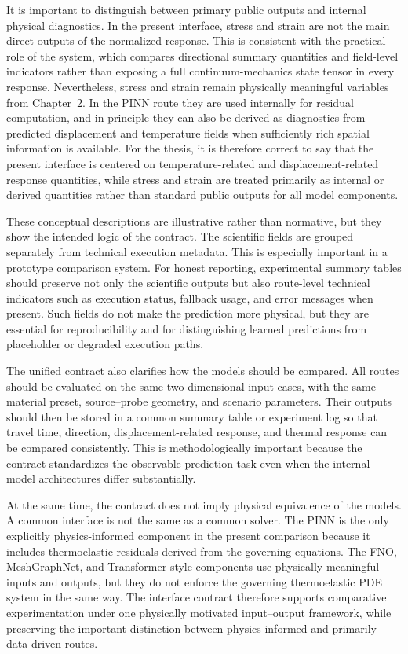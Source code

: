 It is important to distinguish between primary public outputs and internal physical diagnostics. In the present interface, stress and strain are not the main direct outputs of the normalized response. This is consistent with the practical role of the system, which compares directional summary quantities and field-level indicators rather than exposing a full continuum-mechanics state tensor in every response. Nevertheless, stress and strain remain physically meaningful variables from Chapter~2. In the PINN route they are used internally for residual computation, and in principle they can also be derived as diagnostics from predicted displacement and temperature fields when sufficiently rich spatial information is available. For the thesis, it is therefore correct to say that the present interface is centered on temperature-related and displacement-related response quantities, while stress and strain are treated primarily as internal or derived quantities rather than standard public outputs for all model components.

These conceptual descriptions are illustrative rather than normative, but they show the intended logic of the contract. The scientific fields are grouped separately from technical execution metadata. This is especially important in a prototype comparison system. For honest reporting, experimental summary tables should preserve not only the scientific outputs but also route-level technical indicators such as execution status, fallback usage, and error messages when present. Such fields do not make the prediction more physical, but they are essential for reproducibility and for distinguishing learned predictions from placeholder or degraded execution paths.

The unified contract also clarifies how the models should be compared. All routes should be evaluated on the same two-dimensional input cases, with the same material preset, source--probe geometry, and scenario parameters. Their outputs should then be stored in a common summary table or experiment log so that travel time, direction, displacement-related response, and thermal response can be compared consistently. This is methodologically important because the contract standardizes the observable prediction task even when the internal model architectures differ substantially.

At the same time, the contract does not imply physical equivalence of the models. A common interface is not the same as a common solver. The PINN is the only explicitly physics-informed component in the present comparison because it includes thermoelastic residuals derived from the governing equations. The FNO, MeshGraphNet, and Transformer-style components use physically meaningful inputs and outputs, but they do not enforce the governing thermoelastic PDE system in the same way. The interface contract therefore supports comparative experimentation under one physically motivated input--output framework, while preserving the important distinction between physics-informed and primarily data-driven routes.


